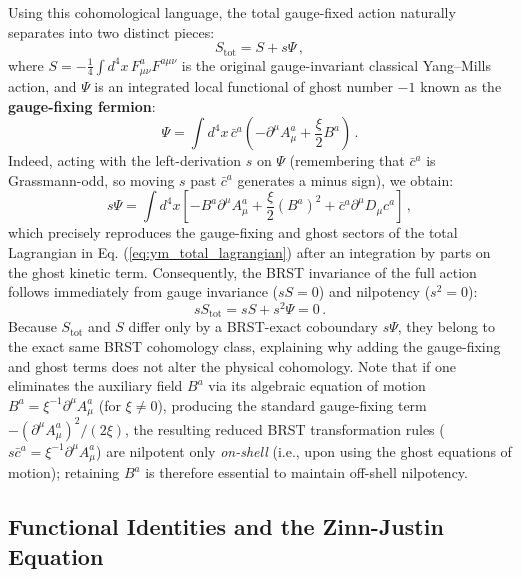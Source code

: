 Using this cohomological language, the total gauge-fixed action naturally separates into two distinct pieces:
\begin{equation} \label{eq:action_brst_separation}
    S_{\text{tot}} = S + s\Psi \, ,
\end{equation}
where \(S = -\frac{1}{4} \int d^4x \, F_{\mu\nu}^a F^{a\mu\nu}\) is the original gauge-invariant classical Yang--Mills action, and \(\Psi\) is an integrated local functional of ghost number \(-1\) known as the \textbf{gauge-fixing fermion}:
\begin{equation} \label{eq:gauge_fermion_def}
    \Psi = \int d^4x \, \bar{c}^a \left( -\partial^\mu A_\mu^a + \frac{\xi}{2} B^a \right) \, .
\end{equation}
Indeed, acting with the left-derivation \(s\) on \(\Psi\) (remembering that \(\bar{c}^a\) is Grassmann-odd, so moving \(s\) past \(\bar{c}^a\) generates a minus sign), we obtain:
\begin{equation} \label{eq:s_psi_expansion}
    s\Psi = \int d^4x \left[ -B^a \partial^\mu A_\mu^a + \frac{\xi}{2}(B^a)^2 + \bar{c}^a \partial^\mu D_\mu c^a \right] \, ,
\end{equation}
which precisely reproduces the gauge-fixing and ghost sectors of the total Lagrangian in Eq. (\ref{eq:ym_total_lagrangian}) after an integration by parts on the ghost kinetic term. Consequently, the BRST invariance of the full action follows immediately from gauge invariance (\(sS = 0\)) and nilpotency (\(s^2 = 0\)):
\[
    s S_{\text{tot}} = sS + s^2 \Psi = 0 \, .
\]
Because \(S_{\text{tot}}\) and \(S\) differ only by a BRST-exact coboundary \(s\Psi\), they belong to the exact same BRST cohomology class, explaining why adding the gauge-fixing and ghost terms does not alter the physical cohomology. Note that if one eliminates the auxiliary field \(B^a\) via its algebraic equation of motion \(B^a = \xi^{-1} \partial^\mu A_\mu^a\) (for \(\xi \neq 0\)), producing the standard gauge-fixing term \(-(\partial^\mu A_\mu^a)^2 / (2\xi)\), the resulting reduced BRST transformation rules (\(s\bar{c}^a = \xi^{-1}\partial^\mu A_\mu^a\)) are nilpotent only \textit{on-shell} (i.e., upon using the ghost equations of motion); retaining \(B^a\) is therefore essential to maintain off-shell nilpotency.

\subsection{Functional Identities and the Zinn-Justin Equation}

